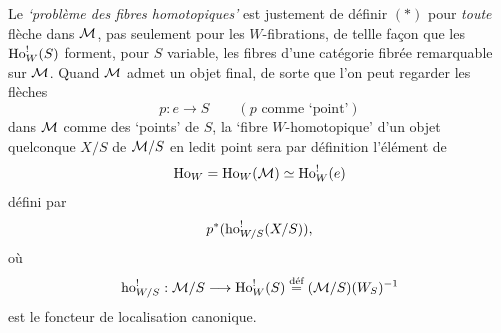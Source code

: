 Le \textit{‘problème des fibres homotopiques’} est justement de définir $(*)$ pour \textit{toute} flèche dans $\mathcal{M}$, pas seulement pour les $W$-fibrations, de tellle façon que les $\mathrm{Ho}^!_W(S)$ forment, pour $S$ %
variable, les fibres d'une catégorie fibrée remarquable sur $\mathcal{M}$. Quand $\mathcal{M}$ admet un objet final, de sorte que l'on peut regarder les flèches
\[
p : e \longrightarrow S \qquad (p \text{ comme ‘point’})
\]
dans $\mathcal{M}$ comme des ‘points’ de $S$, la ‘fibre $W$-homotopique’ d'un objet quelconque $X/S$ de $\mathcal{M}/S$ en ledit point sera par définition l'élément de
\[
\mathrm{Ho}_W = \mathrm{Ho}_W(\mathcal{M}) \simeq \mathrm{Ho}^!_W(e)
\]
défini par
\[
p^*(\mathrm{ho}^!_{W/S}(X/S)),
\]
où
\[
\mathrm{ho}^!_{W/S} : \mathcal{M}/S \longrightarrow \mathrm{Ho}^!_W(S) \overset{\text{déf}}{=} (\mathcal{M}/S)(W_S)^{-1}
\]
est le foncteur de localisation canonique.

